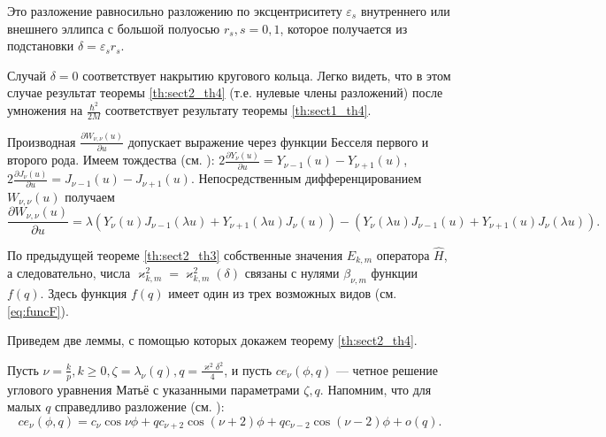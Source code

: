 \begin{remark}
Это разложение равносильно разложению по эксцентриситету $\varepsilon_s$ внутреннего или внешнего эллипса с большой полуосью $r_s, s = 0, 1$, которое получается из подстановки $\delta = \varepsilon_s r_s$.
\end{remark}

\begin{remark}
Случай $\delta=0$ соответствует накрытию кругового кольца. Легко видеть, что в этом случае результат теоремы \ref{th:sect2_th4}  (т.е. нулевые члены разложений) после умножения на $\frac{\hbar^2}{2M}$ соответствует результату теоремы \ref{th:sect1_th4}.
\end{remark}

\begin{remark}
Производная $\frac{\partial W_{\nu, \nu}(u)}{\partial u}$ допускает выражение через функции Бесселя первого и второго рода.
Имеем тождества (см. \cite{wref5}): 
$2\frac{\partial Y_\nu(u)}{\partial u} = Y_{\nu-1}(u) - Y_{\nu+1}(u)$, $2\frac{\partial J_\nu(u)}{\partial u} = J_{\nu-1}(u) - J_{\nu+1}(u)$.
Непосредственным дифференцированием 
$W_{\nu, \nu}(u)$ получаем
$$\frac{\partial W_{\nu, \nu}(u)
}{\partial u} = 
\lambda (Y_\nu(u) J_{\nu-1}(\lambda u)
+  Y_{\nu+1}(\lambda u) J_\nu(u)) - 
 (Y_\nu(\lambda u) J_{\nu-1}(u)  + 
 Y_{\nu+1}(u) J_\nu(\lambda u) ).$$
 \end{remark}

По предыдущей теореме \ref{th:sect2_th3} собственные значения $E_{k, m}$ оператора $\hat{H}$, а следовательно, числа $\varkappa^2_{k,m} = \varkappa^2_{k,m}(\delta)$ связаны с нулями $\beta_{\nu, m}$ функции $f(q)$. Здесь функция $f(q)$ имеет один из трех возможных видов (см. \eqref{eq:funcF}).

Приведем две леммы, с помощью которых докажем теорему \ref{th:sect2_th4}.
\medskip

Пусть $\nu = \frac{k}{p}, k \geq 0, \zeta = \lambda_\nu(q), q=\frac{\varkappa^2 \delta^2}{4}$, и пусть $ce_\nu(\phi, q)$ --- четное решение углового уравнения Матьё с указанными параметрами $\zeta, q$. Напомним, что для малых $q$ справедливо разложение (см. \cite[\S~2.2, с.~122---124]{wref12}):
$$ce_\nu(\phi, q) = c_\nu \cos{\nu \phi} + q c_{\nu+2} \cos{(\nu+2) \phi} +q c_{\nu-2} \cos{(\nu-2) \phi} + o(q).$$ 

